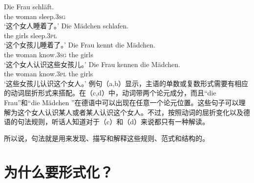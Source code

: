 \eal
\label{Beispiel-mit-Kongruenz}
\ex 
\gll Die Frau schläft.\\
     the woman sleep.\textsc{3sg}\\
\glt `这个女人睡着了。'
\ex 
\gll Die Mädchen schlafen.\\
     the girls sleep.\textsc{3pl}\\
\glt `这个女孩儿睡着了。'
\ex 
\gll Die Frau kennt die Mädchen.\\
     the woman know.\textsc{3sg} the girls\\
\glt `这个女人认识这些女孩儿。'
\ex 
\gll Die Frau kennen die Mädchen.\\
     the woman know.\textsc{3pl} the girls\\
\glt `这些女孩儿认识这个女人。'
\zl
例句（a,b）显示，主语的单数或复数形式需要有相应的动词屈折形式来搭配。在（c,d）中，动词带两个论元成分，而且“die Frau”和“die Mädchen ”在德语中可以出现在任意一个论元位置。这些句子可以理解为这个女人认识某人或者某人认识这个女人。不过，按照动词的屈折变化以及德语的句法规则，听话人知道对于（c）和（d）来说都只有一种解读。
 
所以说，句法就是用来发现、描写和解释这些规则、范式和结构的。

\section{为什么要形式化？}
\label{sec-formal}

